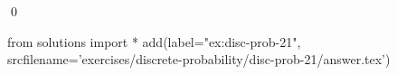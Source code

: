 
\begin{ex} 
  \label{ex:disc-prob-21}
  
  \qed
\end{ex} 
\begin{python0}
from solutions import *
add(label="ex:disc-prob-21",
    srcfilename='exercises/discrete-probability/disc-prob-21/answer.tex') 
\end{python0}

